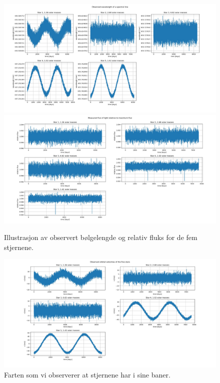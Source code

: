 \documentclass[english,notitlepage]{revtex4-1}  %
\begin{document}
\begin{figure}
  \includegraphics[width=\linewidth]{../output/plots/wavelengths_raw.jpg}
  \includegraphics[width=\linewidth]{../output/plots/flux_raw.jpg}
  \caption{Illustrasjon av observert bølgelengde og relativ fluks for de fem stjernene.}
  \label{fig:raw_data}
\end{figure}

\begin{figure}
  \includegraphics[width=\linewidth]{../output/plots/obs_orb_vels.jpg}
  \caption{Farten som vi observerer at stjernene har i sine baner.}
  \label{fig:obs_orb_vels}
\end{figure}
\end{document}
